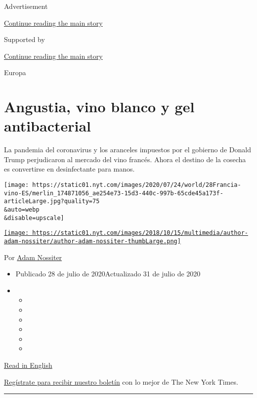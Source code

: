 Advertisement

\protect\hyperlink{after-top}{Continue reading the main story}

Supported by

\protect\hyperlink{after-sponsor}{Continue reading the main story}

Europa

\hypertarget{angustia-vino-blanco-y-gel-antibacterial}{%
\section{Angustia, vino blanco y gel
antibacterial}\label{angustia-vino-blanco-y-gel-antibacterial}}

La pandemia del coronavirus y los aranceles impuestos por el gobierno de
Donald Trump perjudicaron al mercado del vino francés. Ahora el destino
de la cosecha es convertirse en desinfectante para manos.

\texttt{[image: https://static01.nyt.com/images/2020/07/24/world/28Francia-vino-ES/merlin\_174871056\_ae254e73-15d3-440c-997b-65cde45a173f-articleLarge.jpg?quality=75\\\&auto=webp\\\&disable=upscale]}

\href{https://www.nytimes.com/by/adam-nossiter}{\texttt{[image: https://static01.nyt.com/images/2018/10/15/multimedia/author-adam-nossiter/author-adam-nossiter-thumbLarge.png]}}

Por \href{https://www.nytimes.com/by/adam-nossiter}{Adam Nossiter}

\begin{itemize}
\item
  Publicado 28 de julio de 2020Actualizado 31 de julio de 2020
\item
  \begin{itemize}
  \item
  \item
  \item
  \item
  \item
  \item
  \end{itemize}
\end{itemize}

\href{https://www.nytimes.com/2020/07/27/world/europe/france-alsace-wine-coronavirus.html}{Read
in English}

\href{https://www.nytimes.com/newsletters/el-times}{Regístrate para
recibir nuestro boletín} con lo mejor de The New York Times.

\begin{center}\rule{0.5\linewidth}{\linethickness}\end{center}

